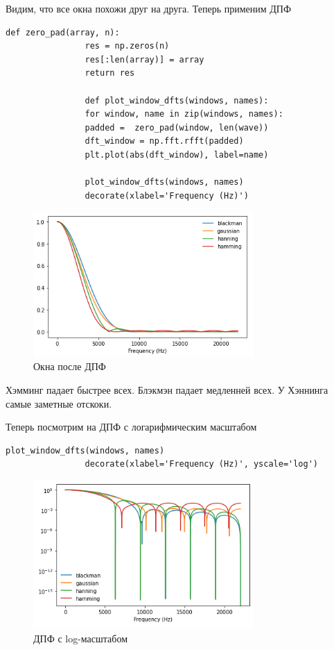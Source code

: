 \documentclass[a4paper,12pt]{article}
\begin{document}
\begin{enumerate}
\begin{enumerate}
			Видим, что все окна похожи друг на друга. Теперь применим ДПФ
			\begin{lstlisting}[caption=Применяем ДПФ]
				def zero_pad(array, n):
				res = np.zeros(n)
				res[:len(array)] = array
				return res
				
				def plot_window_dfts(windows, names):
				for window, name in zip(windows, names):
				padded =  zero_pad(window, len(wave))
				dft_window = np.fft.rfft(padded)
				plt.plot(abs(dft_window), label=name)
				
				plot_window_dfts(windows, names)
				decorate(xlabel='Frequency (Hz)')
			\end{lstlisting}
			\begin{figure}[H]
				\centering
				\includegraphics[width=0.75\textwidth]{3_2.png}
				\caption{Окна после ДПФ}
				\label{fig:3.2}
			\end{figure}
			Хэмминг падает быстрее всех.
			Блэкмэн падает медленней всех.
			У Хэннинга самые заметные отскоки.
			
			Теперь посмотрим на ДПФ с логарифмическим масштабом
			\begin{lstlisting}[caption=ДПФ с log-масштабом]
				plot_window_dfts(windows, names)
				decorate(xlabel='Frequency (Hz)', yscale='log')
			\end{lstlisting}
			\begin{figure}[H]
				\centering
				\includegraphics[width=0.75\textwidth]{3_3.png}
				\caption{ДПФ с log-масштабом}
				\label{fig:3.3}
			\end{figure}
		

\end{enumerate}
\end{enumerate}
\end{document}
